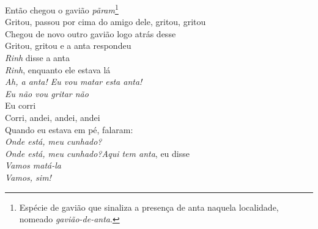 \begin{linenumbers}\begingroup\raggedright
 
\noindent   Então chegou o gavião \emph{pãram}\footnote{Espécie de gavião que
   sinaliza a presença de anta naquela localidade, nomeado \emph{gavião-de-anta}.}\\
  Gritou, passou por cima do amigo dele, gritou, gritou\\
  Chegou de novo outro gavião logo atrás desse\\
  Gritou, gritou e a anta respondeu\\
  \emph{Rinh} disse a anta\\
  \emph{Rinh}, enquanto ele estava lá\\
  \emph{Ah, a anta! Eu vou matar esta anta!}\\
  \emph{Eu não vou gritar não}\\
  Eu corri\\
  Corri, andei, andei, andei\\
  Quando eu estava em pé, falaram:\\
  \emph{Onde está, meu cunhado?}\\
  \emph{Onde está, meu cunhado?}\emph{Aqui tem anta}, eu disse\\
  \emph{Vamos matá-la}\\
  \emph{Vamos, sim!}
 
\end{linenumbers}\endgroup

